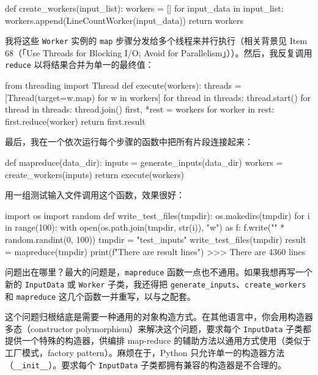 \begin{codebox}[python]
def create_workers(input_list):
    workers = []
    for input_data in input_list:
        workers.append(LineCountWorker(input_data))
    return workers
\end{codebox}

我将这些 \texttt{Worker} 实例的 \texttt{map} 步骤分发给多个线程来并行执行（相关背景见 Item 68（「Use Threads for Blocking I/O; Avoid for Parallelism」））。然后，我反复调用 \texttt{reduce} 以将结果合并为单一的最终值：

\begin{codebox}[python]
from threading import Thread
def execute(workers):
    threads = [Thread(target=w.map) for w in workers]
    for thread in threads:
        thread.start()
    for thread in threads:
        thread.join()
    first, *rest = workers
    for worker in rest:
        first.reduce(worker)
    return first.result
\end{codebox}

最后，我在一个依次运行每个步骤的函数中把所有片段连接起来：

\begin{codebox}[python]
def mapreduce(data_dir):
    inputs = generate_inputs(data_dir)
    workers = create_workers(inputs)
    return execute(workers)
\end{codebox}

用一组测试输入文件调用这个函数，效果很好：

\begin{codebox}[python]
import os
import random
def write_test_files(tmpdir):
    os.makedirs(tmpdir)
    for i in range(100):
        with open(os.path.join(tmpdir, str(i)), "w") as f:
            f.write("\n" * random.randint(0, 100))
tmpdir = "test_inputs"
write_test_files(tmpdir)
result = mapreduce(tmpdir)
print(f"There are {result} lines")
>>>
There are 4360 lines
\end{codebox}

问题出在哪里？最大的问题是，\texttt{mapreduce} 函数一点也不通用。如果我想再写一个新的 \texttt{InputData} 或 \texttt{Worker} 子类，我还得把 \texttt{generate\_inputs}、\texttt{create\_workers} 和 \texttt{mapreduce} 这几个函数一并重写，以与之配套。

这个问题归根结底是需要一种通用的对象构造方式。在其他语言中，你会用构造器多态（constructor polymorphism）来解决这个问题，要求每个 \texttt{InputData} 子类都提供一个特殊的构造器，供编排 map-reduce 的辅助方法以通用方式使用（类似于工厂模式，factory pattern）。麻烦在于，Python 只允许单一的构造器方法（\texttt{\_\_init\_\_}）。要求每个 \texttt{InputData} 子类都拥有兼容的构造器是不合理的。

